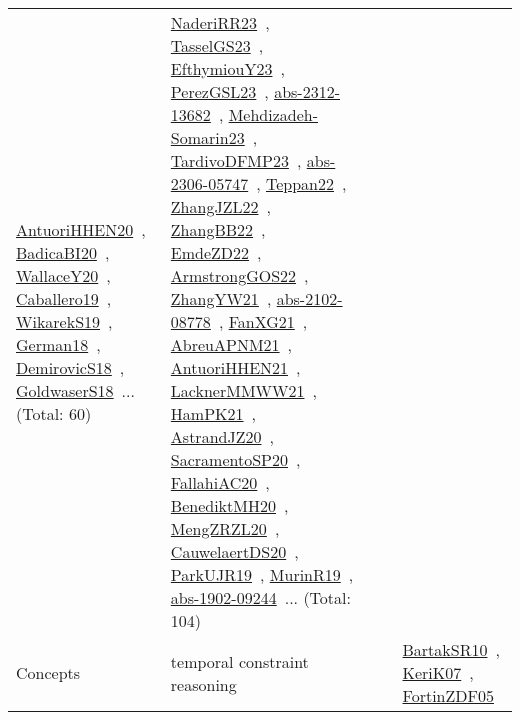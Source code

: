 {\begin{longtable}{lp{3cm}>{\raggedright\arraybackslash}p{6cm}>{\raggedright\arraybackslash}p{6cm}>{\raggedright\arraybackslash}p{8cm}}
\href{works/AntuoriHHEN20.pdf}{AntuoriHHEN20}~\cite{AntuoriHHEN20}, \href{works/BadicaBI20.pdf}{BadicaBI20}~\cite{BadicaBI20}, \href{works/WallaceY20.pdf}{WallaceY20}~\cite{WallaceY20}, \href{works/Caballero19.pdf}{Caballero19}~\cite{Caballero19}, \href{works/WikarekS19.pdf}{WikarekS19}~\cite{WikarekS19}, \href{works/German18.pdf}{German18}~\cite{German18}, \href{works/DemirovicS18.pdf}{DemirovicS18}~\cite{DemirovicS18}, \href{works/GoldwaserS18.pdf}{GoldwaserS18}~\cite{GoldwaserS18}... (Total: 60) & \href{works/NaderiRR23.pdf}{NaderiRR23}~\cite{NaderiRR23}, \href{works/TasselGS23.pdf}{TasselGS23}~\cite{TasselGS23}, \href{works/EfthymiouY23.pdf}{EfthymiouY23}~\cite{EfthymiouY23}, \href{works/PerezGSL23.pdf}{PerezGSL23}~\cite{PerezGSL23}, \href{works/abs-2312-13682.pdf}{abs-2312-13682}~\cite{abs-2312-13682}, \href{works/Mehdizadeh-Somarin23.pdf}{Mehdizadeh-Somarin23}~\cite{Mehdizadeh-Somarin23}, \href{works/TardivoDFMP23.pdf}{TardivoDFMP23}~\cite{TardivoDFMP23}, \href{works/abs-2306-05747.pdf}{abs-2306-05747}~\cite{abs-2306-05747}, \href{works/Teppan22.pdf}{Teppan22}~\cite{Teppan22}, \href{works/ZhangJZL22.pdf}{ZhangJZL22}~\cite{ZhangJZL22}, \href{works/ZhangBB22.pdf}{ZhangBB22}~\cite{ZhangBB22}, \href{works/EmdeZD22.pdf}{EmdeZD22}~\cite{EmdeZD22}, \href{works/ArmstrongGOS22.pdf}{ArmstrongGOS22}~\cite{ArmstrongGOS22}, \href{works/ZhangYW21.pdf}{ZhangYW21}~\cite{ZhangYW21}, \href{works/abs-2102-08778.pdf}{abs-2102-08778}~\cite{abs-2102-08778}, \href{works/FanXG21.pdf}{FanXG21}~\cite{FanXG21}, \href{works/AbreuAPNM21.pdf}{AbreuAPNM21}~\cite{AbreuAPNM21}, \href{works/AntuoriHHEN21.pdf}{AntuoriHHEN21}~\cite{AntuoriHHEN21}, \href{works/LacknerMMWW21.pdf}{LacknerMMWW21}~\cite{LacknerMMWW21}, \href{works/HamPK21.pdf}{HamPK21}~\cite{HamPK21}, \href{works/AstrandJZ20.pdf}{AstrandJZ20}~\cite{AstrandJZ20}, \href{works/SacramentoSP20.pdf}{SacramentoSP20}~\cite{SacramentoSP20}, \href{works/FallahiAC20.pdf}{FallahiAC20}~\cite{FallahiAC20}, \href{works/BenediktMH20.pdf}{BenediktMH20}~\cite{BenediktMH20}, \href{works/MengZRZL20.pdf}{MengZRZL20}~\cite{MengZRZL20}, \href{works/CauwelaertDS20.pdf}{CauwelaertDS20}~\cite{CauwelaertDS20}, \href{works/ParkUJR19.pdf}{ParkUJR19}~\cite{ParkUJR19}, \href{works/MurinR19.pdf}{MurinR19}~\cite{MurinR19}, \href{works/abs-1902-09244.pdf}{abs-1902-09244}~\cite{abs-1902-09244}... (Total: 104)\\
Concepts & temporal constraint reasoning &  &  & \href{works/BartakSR10.pdf}{BartakSR10}~\cite{BartakSR10}, \href{works/KeriK07.pdf}{KeriK07}~\cite{KeriK07}, \href{works/FortinZDF05.pdf}{FortinZDF05}~\cite{FortinZDF05}\\

\end{longtable}}
